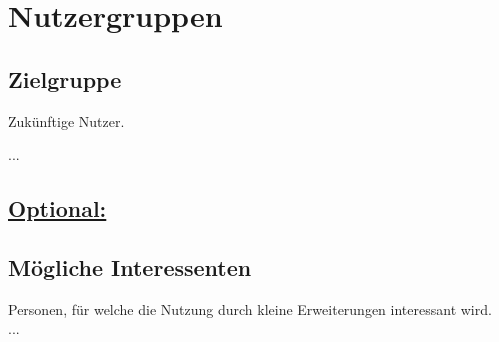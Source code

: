 %
%


\chapter{Nutzergruppen}
\label{Nutzergruppen}


\section{Zielgruppe}

Zukünftige Nutzer.

...
\\


\section*{\underline{Optional:}}

\section{Mögliche Interessenten}

Personen, für welche die Nutzung durch kleine Erweiterungen interessant wird.\\

...
\\


